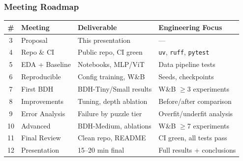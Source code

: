 \documentclass{beamer}
\begin{document}
\begin{frame}
\frametitle{Meeting Roadmap}

\begin{table}
\centering
\footnotesize
\begin{tabular}{clll}
\toprule
\textbf{\#} & \textbf{Meeting} & \textbf{Deliverable} & \textbf{Engineering Focus} \\
\midrule
3 & \alert{Proposal} & \alert{This presentation} & --- \\
4 & Repo \& CI & Public repo, CI green & \texttt{uv}, \texttt{ruff}, \texttt{pytest} \\
5 & EDA + Baseline & Notebooks, MLP/ViT & Data pipeline tests \\
6 & Reproducible & Config training, W\&B & Seeds, checkpoints \\
7 & First BDH & BDH-Tiny/Small results & W\&B $\geq$3 experiments \\
8 & Improvements & Tuning, depth ablation & Before/after comparison \\
9 & Error Analysis & Failure by puzzle tier & Overfit/underfit analysis \\
10 & Advanced & BDH-Medium, ablations & W\&B $\geq$7 experiments \\
11 & Final Review & Clean repo, README & CI green, all tests pass \\
12 & Presentation & 15--20 min final & Full results + conclusions \\
\bottomrule
\end{tabular}
\end{table}

\end{frame}
\end{document}
